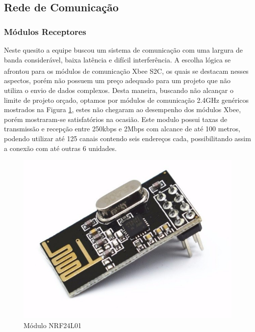 \subsection{Rede de Comunicação}\label{subsec:rede_com}

\subsubsection{Módulos Receptores}\label{subsec:recept_models}

Neste quesito a equipe buscou um sistema de comunicação com uma largura de banda considerável, baixa latência e difícil interferência.
A escolha lógica se afrontou para os módulos de comunicação Xbee\textsuperscript{\textregistered} S2C, os quais se destacam nesses aspectos, porém não possuem um preço adequado para um projeto que não utiliza o envio de dados complexos. 
Desta maneira, buscando não alcançar o limite de projeto orçado, optamos por módulos de comunicação 2.4GHz genéricos mostrados na Figura \ref{fig:modulo_comunication}, estes não chegaram ao desempenho dos módulos Xbee, porém mostraram-se satisfatórios na ocasião. Este modulo possui taxas de transmissão e recepção entre 250kbps e 2Mbps com alcance de até 100 metros, podendo utilizar até 125 canais contendo seis endereços cada, possibilitando assim a conexão com até outras 6 unidades.

\begin{figure}[htbp]
\centerline{\includegraphics[width=\columnwidth]{capitulos/imagens/modulo_comunication.png}}
\caption{Módulo  NRF24L01}
\label{fig:modulo_comunication}
\end{figure}


